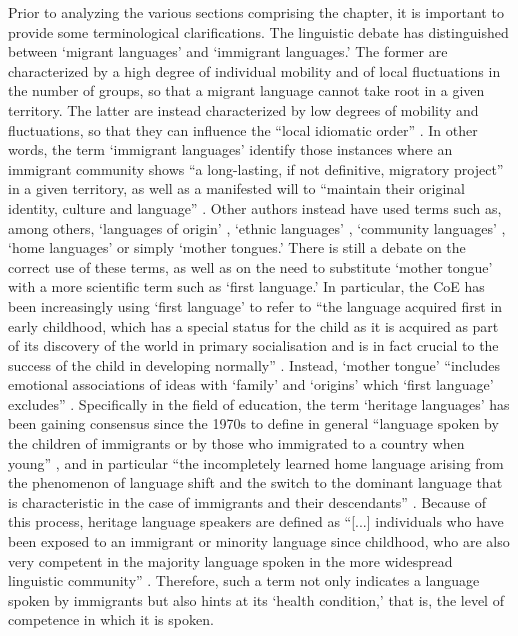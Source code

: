 \documentclass[output=paper,colorlinks,citecolor=brown]{langscibook}
\begin{document}
Prior to analyzing the various sections comprising the chapter, it is important to provide some terminological clarifications. The linguistic debate has distinguished between `migrant languages' and `immigrant languages.' The former are characterized by a high degree of individual mobility and of local fluctuations in the number of groups, so that a migrant language cannot take root in a given territory. The latter are instead characterized by low degrees of mobility and fluctuations, so that they can influence the ``local idiomatic order'' \citep{bagna_machetti_vedovelli2003}. In other words, the term `immigrant languages' identify those instances where an immigrant community shows ``a long-lasting, if not definitive, migratory project'' \citep{orioles2007} in a given territory, as well as a manifested will to ``maintain their original identity, culture and language'' \citep{orioles2007,panzeri2016}. Other authors \citep{trifonas_aravossitas2018} instead have used terms such as, among others, `languages of origin' \citep{makarova2014}, `ethnic languages' \citep{saint-jacques1979}, `community languages' \citep{wiley2005}, `home languages' \citep{yeung_marsh_suliman2000} or simply `mother tongues.' There is still a debate on the correct use of these terms, as well as on the need to substitute `mother tongue' with a more scientific term such as `first language.' In particular, the CoE has been increasingly using `first language' to refer to ``the language acquired first in early childhood, which has a special status for the child as it is acquired as part of its discovery of the world in primary socialisation and is in fact crucial to the success of the child in developing normally'' \citep{coe2007}.  Instead, `mother tongue' ``includes emotional associations of ideas with `family' and `origins' which `first language' excludes'' \citep{coe2007}. Specifically in the field of education, the term `heritage languages' has been gaining consensus since the 1970s to define in general ``language spoken by the children of immigrants or by those who immigrated to a country when young'' \citep{cho_shin_krashen2004}, and in particular ``the incompletely learned home language arising from the phenomenon of language shift and the switch to the dominant language that is characteristic in the case of immigrants and their descendants'' \citep{trifonas_aravossitas2018,polinsky_kagan2007}. Because of this process, heritage language speakers are defined as ``[...] individuals who have been exposed to an immigrant or minority language since childhood, who are also very competent in the majority language spoken in the more widespread linguistic community'' \citep{montrul2015}. Therefore, such a term not only indicates a language spoken by immigrants but also hints at its `health condition,' that is, the level of competence in which it is spoken. 
\end{document}
